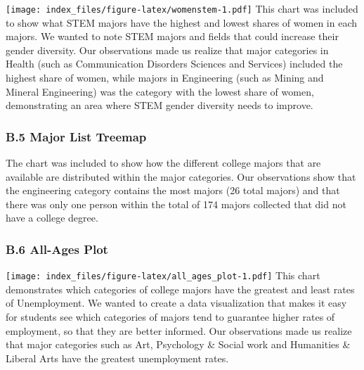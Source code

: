 \documentclass[
]{article}
\begin{document}
\texttt{[image: index\_files/figure-latex/womenstem-1.pdf]} This chart
was included to show what STEM majors have the highest and lowest shares
of women in each majors. We wanted to note STEM majors and fields that
could increase their gender diversity. Our observations made us realize
that major categories in Health (such as Communication Disorders
Sciences and Services) included the highest share of women, while majors
in Engineering (such as Mining and Mineral Engineering) was the category
with the lowest share of women, demonstrating an area where STEM gender
diversity needs to improve.

\hypertarget{b.5-major-list-treemap}{%
\subsubsection{B.5 \textbar{} Major List
Treemap}\label{b.5-major-list-treemap}}

The chart was included to show how the different college majors that are
available are distributed within the major categories. Our observations
show that the engineering category contains the most majors (26 total
majors) and that there was only one person within the total of 174
majors collected that did not have a college degree.

\hypertarget{b.6-all-ages-plot}{%
\subsubsection{B.6 \textbar{} All-Ages Plot}\label{b.6-all-ages-plot}}

\texttt{[image: index\_files/figure-latex/all\_ages\_plot-1.pdf]} This
chart demonstrates which categories of college majors have the greatest
and least rates of Unemployment. We wanted to create a data
visualization that makes it easy for students see which categories of
majors tend to guarantee higher rates of employment, so that they are
better informed. Our observations made us realize that major categories
such as Art, Psychology \& Social work and Humanities \& Liberal Arts
have the greatest unemployment rates.
\end{document}
